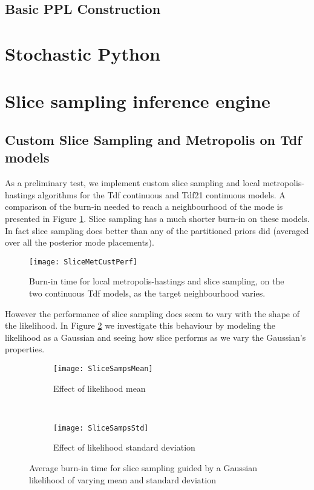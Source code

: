 \subsection{Basic PPL Construction}

\section{Stochastic Python}
\label{sect:StocPy}

\section{Slice sampling inference engine}
\subsection{Custom Slice Sampling and Metropolis on Tdf models}

As a preliminary test, we implement custom slice sampling and local metropolis-hastings algorithms for the Tdf continuous and Tdf21 continuous models. A comparison of the burn-in needed to reach a neighbourhood of the mode is presented in Figure \ref{fig:SliceMetCustPerf}. Slice sampling has a much shorter burn-in on these models. In fact slice sampling does better than any of the partitioned priors did (averaged over all the posterior mode placements).

\begin{figure}[h]
    \centering
    \texttt{[image: SliceMetCustPerf]}
    \caption{Burn-in time for local metropolis-hastings and slice sampling, on the two continuous Tdf models, as the target neighbourhood varies.}
    \label{fig:SliceMetCustPerf}
\end{figure}

However the performance of slice sampling does seem to vary with the shape of the likelihood. In Figure \ref{fig:sliceGaussLik} we investigate this behaviour by modeling the likelihood as a Gaussian and seeing how slice performs as we vary the Gaussian's properties.

\begin{figure}[h]
    \centering
    \begin{subfigure}[t]{0.48\textwidth}
      \texttt{[image: SliceSampsMean]}
      \caption{Effect of likelihood mean}
    \end{subfigure}
    ~
    \begin{subfigure}[t]{0.48\textwidth}
      \texttt{[image: SliceSampsStd]}
      \caption{Effect of likelihood standard deviation}
    \end{subfigure}
    \caption{Average burn-in time for slice sampling guided by a Gaussian likelihood of varying mean and standard deviation}
    \label{fig:sliceGaussLik}
\end{figure}

